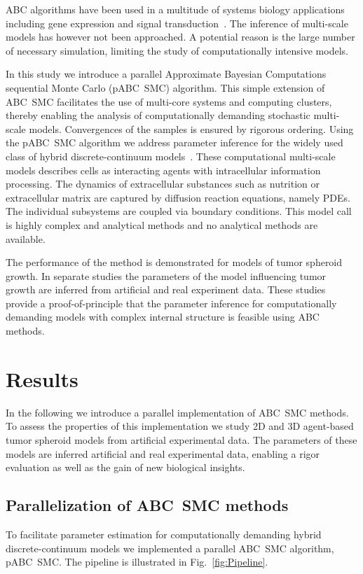 \documentclass[10pt,letterpaper]{article}
\begin{document}
ABC algorithms have been used in a multitude of systems biology applications including gene expression and signal transduction~\cite{ToniWel2009,ToniJov2011,LillacciKha2013,LiepeFil2013,LoosMar2015}. The inference of multi-scale models has however not been approached. A potential reason is the large number of necessary simulation, limiting the study of computationally intensive models.

In this study we introduce a parallel Approximate Bayesian Computations sequential Monte Carlo (pABC~SMC) algorithm. This simple extension of ABC~SMC facilitates the use of multi-core systems and computing clusters, thereby enabling the analysis of computationally demanding stochastic multi-scale models. Convergences of the samples is ensured by rigorous ordering. Using the pABC~SMC algorithm we address parameter inference for the widely used class of hybrid discrete-continuum models~\cite{AndersonQua2008,RichmondWal2010,SwatTho2012,HoehmeBru2010,Jagiella2012,StarrussBac2014,Jagiella2015}. These computational multi-scale models describes cells as interacting agents with intracellular information processing. The dynamics of extracellular substances such as nutrition or extracellular matrix are captured by diffusion reaction equations, namely PDEs. The individual subsystems are coupled via boundary conditions. This model call is highly complex and analytical methods and no analytical methods are available.

The performance of the method is demonstrated for models of tumor spheroid growth. In separate studies the parameters of the model influencing tumor growth are inferred from artificial and real experiment data. These studies provide a proof-of-principle that the parameter inference for computationally demanding models with complex internal structure is feasible using ABC methods.

\section*{Results}

In the following we introduce a parallel implementation of ABC~SMC methods. To assess the properties of this implementation we study 2D and 3D agent-based tumor spheroid models from artificial experimental data. The parameters of these models are inferred artificial and real experimental data, enabling a rigor evaluation as well as the gain of new biological insights.

\subsection*{Parallelization of ABC~SMC methods}
To facilitate parameter estimation for computationally demanding hybrid discrete-continuum models we implemented a parallel ABC~SMC algorithm, pABC~SMC. The pipeline is illustrated in Fig.~\ref{fig:Pipeline}. 
\end{document}
